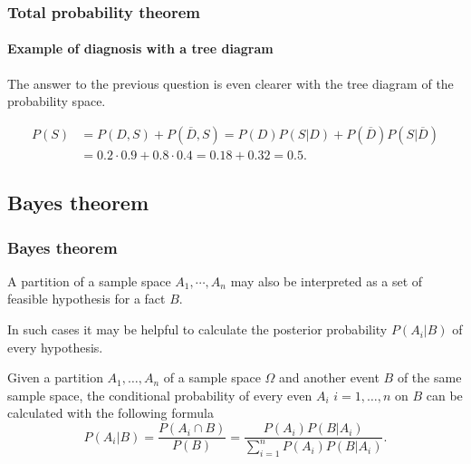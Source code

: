 \begin{frame}
\frametitle{Total probability theorem}
\framesubtitle{Example of diagnosis with a tree diagram}
The answer to the previous question is even clearer with the tree diagram of the probability space.

\begin{center}
\end{center}

\begin{align*}
P(S) &= P(D,S) + P(\overline D,S) = P(D)P(S|D)+P(\overline D)P(S|\overline D)\\
& = 0.2\cdot 0.9+ 0.8\cdot 0.4 = 0.18 + 0.32 = 0.5.
\end{align*}
\end{frame}


\subsection{Bayes theorem}

\begin{frame}
\frametitle{Bayes theorem}
A partition of a sample space $A_1,\cdots,A_n$ may also be interpreted as a set of feasible hypothesis for a fact $B$.

In such cases it may be helpful to calculate the posterior probability $P(A_i|B)$ of every hypothesis.

\begin{theorem}[Bayes]
Given a partition $A_1,\ldots,A_n$ of a sample space $\Omega$ and another event $B$ of the same sample space, the
conditional probability of every even $A_i$ $i=1,\ldots,n$ on $B$ can be calculated with the following formula
\[
P(A_i|B) = \frac{P(A_i\cap B)}{P(B)} = \frac{P(A_i)P(B|A_i)}{\sum_{i=1}^n P(A_i)P(B|A_i)}.
\]
\end{theorem}
\end{frame}


